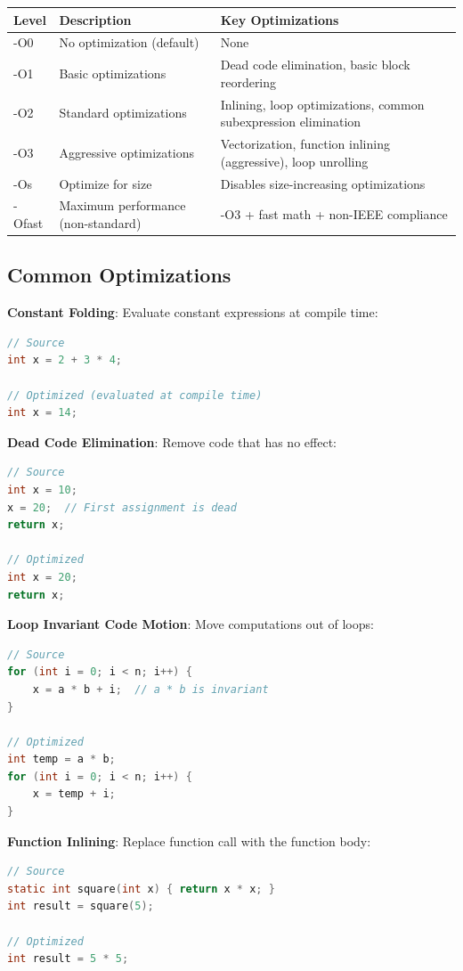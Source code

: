 \begin{tabular}{|l|p{8cm}|l|}
\hline
\textbf{Level} & \textbf{Description} & \textbf{Key Optimizations} \\
\hline
-O0 & No optimization (default) & None \\
\hline
-O1 & Basic optimizations & Dead code elimination, basic block reordering \\
\hline
-O2 & Standard optimizations & Inlining, loop optimizations, common subexpression elimination \\
\hline
-O3 & Aggressive optimizations & Vectorization, function inlining (aggressive), loop unrolling \\
\hline
-Os & Optimize for size & Disables size-increasing optimizations \\
\hline
-Ofast & Maximum performance (non-standard) & -O3 + fast math + non-IEEE compliance \\
\hline
\end{tabular}

\subsection{Common Optimizations}

\textbf{Constant Folding}: Evaluate constant expressions at compile time:
\begin{lstlisting}[language=C]
// Source
int x = 2 + 3 * 4;

// Optimized (evaluated at compile time)
int x = 14;
\end{lstlisting}

\textbf{Dead Code Elimination}: Remove code that has no effect:
\begin{lstlisting}[language=C]
// Source
int x = 10;
x = 20;  // First assignment is dead
return x;

// Optimized
int x = 20;
return x;
\end{lstlisting}

\textbf{Loop Invariant Code Motion}: Move computations out of loops:
\begin{lstlisting}[language=C]
// Source
for (int i = 0; i < n; i++) {
    x = a * b + i;  // a * b is invariant
}

// Optimized
int temp = a * b;
for (int i = 0; i < n; i++) {
    x = temp + i;
}
\end{lstlisting}

\textbf{Function Inlining}: Replace function call with the function body:
\begin{lstlisting}[language=C]
// Source
static int square(int x) { return x * x; }
int result = square(5);

// Optimized
int result = 5 * 5;
\end{lstlisting}

